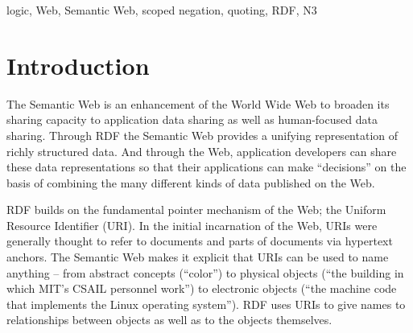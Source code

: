 \documentclass{tlp}
\begin{document}
\begin{keywords}
logic, Web, Semantic Web, scoped negation, quoting, RDF, N3
\end{keywords}

\section{Introduction}



The Semantic Web is an enhancement of the World Wide Web to broaden
its sharing capacity to application data sharing as well as
human-focused data sharing. Through RDF the Semantic Web provides a
unifying representation of richly structured data.  And through the
Web, application developers can share these data representations so
that their applications can make ``decisions'' on the basis of combining
the many different kinds of data published on the Web.

RDF builds on the fundamental pointer mechanism of the Web; the
Uniform Resource Identifier (URI).  In the initial incarnation of the
Web, URIs were generally thought to refer to documents and parts of
documents via hypertext anchors. The Semantic Web makes it explicit
that URIs can be used to name anything -- from abstract concepts
(``color'') to physical objects (``the building in which MIT's CSAIL
personnel work'') to electronic objects (``the machine code that
implements the Linux operating system'').  RDF uses URIs to give names
to relationships between objects as well as to the objects themselves.
\end{document}
